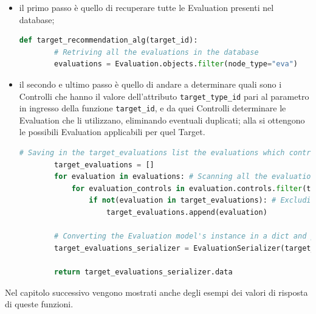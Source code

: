 \begin{itemize}
    \item il primo passo è quello di recuperare tutte le Evaluation presenti nel database;
    \begin{lstlisting}[language=Python, label=lst:IB_CF_Target_1]
    def target_recommendation_alg(target_id):
        # Retriving all the evaluations in the database
        evaluations = Evaluation.objects.filter(node_type="eva")
    \end{lstlisting} 
    \item il secondo e ultimo passo è quello di andare a determinare quali sono i Controlli che hanno il valore dell'attributo \texttt{target\_type\_id} 
    pari al parametro in ingresso della funzione \texttt{target\_id}, e da quei Controlli determinare le Evaluation che li utilizzano, 
    eliminando eventuali duplicati; alla si ottengono le possibili Evaluation applicabili per quel Target.
    \begin{lstlisting}[language=Python, label=lst:IB_CF_Target_2]
        # Saving in the target_evaluations list the evaluations which controls have target_type_id equal to target_id
        target_evaluations = []
        for evaluation in evaluations: # Scanning all the evaluations
            for evaluation_controls in evaluation.controls.filter(target_type_id=target_id):
                if not(evaluation in target_evaluations): # Excluding evaluations duplicated
                    target_evaluations.append(evaluation)
        
        # Converting the Evaluation model's instance in a dict and putting the evaluation, as a dict, in a list
        target_evaluations_serializer = EvaluationSerializer(target_evaluations, many=True)
        
        return target_evaluations_serializer.data
    \end{lstlisting} 
\end{itemize}
%
Nel capitolo successivo vengono mostrati anche degli esempi dei valori di risposta di queste funzioni.
%
